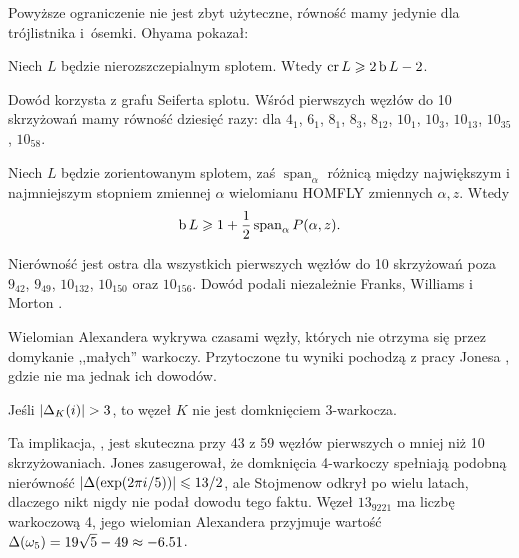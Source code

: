 Powyższe ograniczenie nie jest zbyt użyteczne, równość mamy jedynie dla trójlistnika i~ósemki.
Ohyama \cite{ohyama1993} pokazał:
%

\begin{proposition}
    Niech $L$ będzie nierozszczepialnym splotem.
    Wtedy $\operatorname{cr} L \geqslant 2 \operatorname{b} L - 2$.
\end{proposition}

Dowód korzysta z grafu Seiferta splotu.
%
Wśród pierwszych węzłów do 10 skrzyżowań mamy równość dziesięć razy: dla $4_1$, $6_1$, $8_1$, $8_3$, $8_{12}$, $10_1$, $10_3$, $10_{13}$, $10_{35}$, $10_{58}$.

\begin{proposition}
%
    Niech $L$ będzie zorientowanym splotem, zaś $\operatorname{span}_\alpha$ różnicą między największym i najmniejszym stopniem zmiennej $\alpha$ wielomianu HOMFLY zmiennych $\alpha, z$.
    Wtedy
    \begin{equation}
        \operatorname{b} L \geqslant 1 + \frac 1 2 \operatorname{span}_\alpha P(\alpha, z).
    \end{equation}
\end{proposition}

Nierówność jest ostra dla wszystkich pierwszych węzłów do 10 skrzyżowań poza $9_{42}$, $9_{49}$, $10_{132}$, $10_{150}$ oraz $10_{156}$.
Dowód podali niezależnie Franks, Williams \cite{franks1987} i Morton \cite{morton1988}.
%
%
%

Wielomian Alexandera wykrywa czasami węzły, których nie otrzyma się przez domykanie ,,małych'' warkoczy.
%
Przytoczone tu wyniki pochodzą z pracy Jonesa \cite{jones1985}, gdzie nie ma jednak ich dowodów.

\begin{proposition}
    Jeśli $|\Delta_K(i)| > 3$, to węzeł $K$ nie jest domknięciem 3-warkocza.
\end{proposition}

Ta implikacja, \cite[wniosek 23]{jones1985}, jest skuteczna przy 43 z 59 węzłów pierwszych o mniej niż 10 skrzyżowaniach.
Jones \cite[wniosek 24]{jones1985} zasugerował, że domknięcia 4-warkoczy spełniają podobną nierówność $|\Delta (\exp (2\pi i / 5))| \leqslant 13/2$, ale Stojmenow \cite{stoimenow2002} odkrył po wielu latach, dlaczego nikt nigdy nie podał dowodu tego faktu.
Węzeł $13_{9221}$ ma liczbę warkoczową 4, jego wielomian Alexandera przyjmuje wartość $\Delta(\omega_5) = 19\sqrt{5} - 49 \approx -6.51$.

